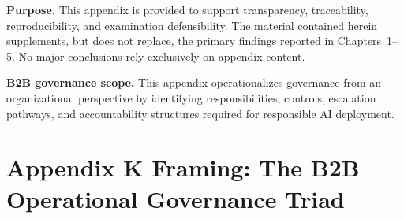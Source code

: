 

\noindent\textbf{Purpose.} This appendix is provided to support transparency, traceability, reproducibility, and examination defensibility. The material contained herein supplements, but does not replace, the primary findings reported in Chapters~1--5. No major conclusions rely exclusively on appendix content.


\noindent\textbf{B2B governance scope.} This appendix operationalizes governance from an organizational perspective by identifying responsibilities, controls, escalation pathways, and accountability structures required for responsible AI deployment.


\section*{Appendix K Framing: The B2B Operational Governance Triad}
\label{sec:appk_framing}

